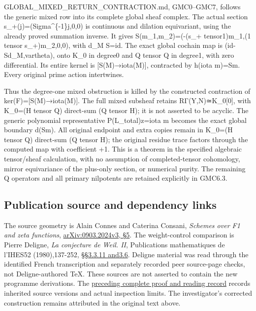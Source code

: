 GLOBAL\_MIXED\_RETURN\_CONTRACTION.md, GMC0--GMC7, follows the generic
mixed row into its complete global sheaf complex. The actual section
s\_+(j)=(Sigma\^{}\{-1\}j,0,0) is continuous and dilation equivariant,
using the already proved summation inverse. It gives
S(m\_1,m\_2)=(-(s\_+ tensor1)m\_1,(1 tensor s\_+)m\_2,0,0), with d\_M
S=id. The exact global cochain map is (id-Sd\_M,vartheta), onto K\_0 in
degree0 and Q tensor Q in degree1, with zero differential. Its entire
kernel is {[}S(M)→iota(M){]}, contracted by h(iota m)=Sm. Every original
prime action intertwines.

Thus the degree-one mixed obstruction is killed by the constructed
contraction of ker(F)={[}S(M)→iota(M){]}. The full mixed subsheaf
retains RΓ(Y,N)≃K\_0{[}0{]}, with K\_0=(H tensor Q) direct-sum (Q tensor
H); it is not asserted to be acyclic. The generic polynomial
representative P(L\_total)z=iota m becomes the exact global boundary
d(Sm). All original endpoint and extra copies remain in K\_0=(H tensor
Q) direct-sum (Q tensor H); the original residue trace factors through
the computed map with coefficient +1. This is a theorem in the specified
algebraic tensor/sheaf calculation, with no assumption of
completed-tensor cohomology, mirror equivariance of the plus-only
section, or numerical purity. The remaining Q operators and all primary
nilpotents are retained explicitly in GMC6.3.

\subsection{Publication source and dependency
links}\label{publication-source-and-dependency-links}

The source geometry is Alain Connes and Caterina Consani, \emph{Schemes
over F1 and zeta functions},
\href{https://arxiv.org/abs/0903.2024v3}{arXiv:0903.2024v3, §5}. The
weight-control comparison is Pierre Deligne, \emph{La conjecture de
Weil. II}, Publications mathematiques de l'IHES52 (1980),137-252,
\href{https://www.numdam.org/item/PMIHES_1980__52__137_0/}{§§3.3.11
and3.6}. Deligne material was read through the identified French
transcription and separately recorded peer source-page checks, not
Deligne-authored TeX. These sources are not asserted to contain the new
programme derivations. The
\href{https://github.com/KokunoYumeto/zeta-function-research-reader/blob/36a82ecca98addb8a98b48204e349737856c7223/workbenches/splitzero-tandem/continuations/20260924-cohomology-weight-and-character-lifts/BUILD_AND_REVIEW.md}{preceding
complete proof and reading record} records inherited source versions and
actual inspection limits. The investigator's corrected construction
remains attributed in the original text above.
